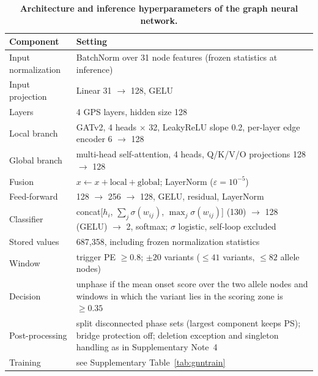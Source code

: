 \documentclass[11pt,a4paper]{article}
\begin{document}
\begin{table}[h]
\caption{\textbf{Architecture and inference hyperparameters of the graph neural network.}}
\label{tab:gnnhyper}
\small
\begin{tabular}{@{}L{5cm} L{8.5cm}@{}}
\toprule
Component & Setting \\
\midrule
Input normalization & BatchNorm over 31 node features (frozen statistics at inference) \\
Input projection & Linear 31 $\rightarrow$ 128, GELU \\
Layers & 4 GPS layers, hidden size 128 \\
Local branch & GATv2, 4 heads $\times$ 32, LeakyReLU slope 0.2, per-layer edge encoder 6 $\rightarrow$ 128 \\
Global branch & multi-head self-attention, 4 heads, Q/K/V/O projections 128 $\rightarrow$ 128 \\
Fusion & $x \leftarrow x + \mathrm{local} + \mathrm{global}$; LayerNorm ($\varepsilon = 10^{-5}$) \\
Feed-forward & 128 $\rightarrow$ 256 $\rightarrow$ 128, GELU, residual, LayerNorm \\
Classifier & concat[$h_i$, $\sum_j \sigma(w_{ij})$, $\max_j \sigma(w_{ij})$] (130) $\rightarrow$ 128 (GELU) $\rightarrow$ 2, softmax; $\sigma$ logistic, self-loop excluded \\
Stored values & 687,358, including frozen normalization statistics \\
Window & trigger PE $\ge 0.8$; $\pm 20$ variants ($\le 41$ variants, $\le 82$ allele nodes) \\
Decision & unphase if the mean onset score over the two allele nodes and windows in which the variant lies in the scoring zone is $\ge 0.35$ \\
Post-processing & split disconnected phase sets (largest component keeps PS); bridge protection off; deletion exception and singleton handling as in Supplementary Note~4 \\
Training & see Supplementary Table~\ref{tab:gnntrain} \\
\bottomrule
\end{tabular}
\end{table}
\FloatBarrier
\end{document}
